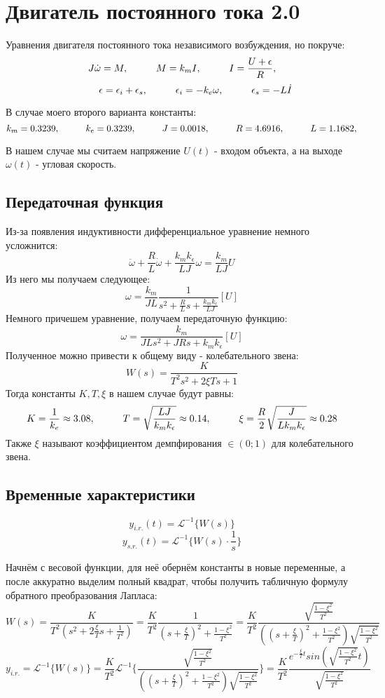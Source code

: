 \chapter{Двигатель постоянного тока 2.0}
\label{ch:chap2}

Уравнения двигателя постоянного тока независимого возбуждения, но покруче:
$$
  J\dot{\omega} = M, \hspace*{1cm} M=k_mI, \hspace*{1cm} I = \frac{U + \epsilon}{R}, 
$$
$$
\hspace*{1cm} \epsilon = \epsilon_i + \epsilon_s, \hspace*{1cm} \epsilon_i = -k_e\omega ,\hspace*{1cm} \epsilon_s = - L\dot{I}
$$

В случае моего второго варианта константы:
$$
  k_m = 0.3239, \hspace*{1cm} k_e = 0.3239, \hspace*{1cm} J =0.0018, \hspace*{1cm} R =4.6916, \hspace*{1cm} L =1.1682, 
$$

В нашем случае мы считаем напряжение $U(t)$ - входом объекта, а на выходе $\omega(t)$ - угловая скорость.

\section{Передаточная функция}
Из-за появления индуктивности дифференциальное уравнение немного усложнится:
$$
\ddot{\omega} + \frac{R}{L}\dot{\omega} + \frac{k_m k_\epsilon}{LJ}\omega = \frac{k_m}{LJ}U
$$
Из него мы получаем следующее:
$$
\omega = \frac{k_m}{JL}\frac{1}{s^2 + \frac{R}{L}s + \frac{k_m k_\epsilon}{LJ}}[U]
$$
Немного причешем уравнение, получаем передаточную функцию:
$$
\omega = \frac{k_m}{JLs^2 + JRs + k_m k_\epsilon}[U]
$$
Полученное можно привести к общему виду - колебательного звена:
$$
W(s) = \frac{K}{T^2 s^2 + 2\xi Ts + 1}
$$
Тогда константы $K, T, \xi$ в нашем случае будут равны:
$$
 K= \frac{1}{k_e} \approx 3.08, \hspace*{1cm} T = \sqrt{\frac{LJ}{k_m k_\epsilon}}\approx 0.14, \hspace*{1cm} \xi = \frac{R}{2}\sqrt{\frac{J}{L k_m k_\epsilon}} \approx 0.28
$$
Также $\xi$ называют коэффициентом демпфирования $\in (0; 1)$ для колебательного звена.

\section{Временные  характеристики}

$$
y_{i.r.}(t) = \mathcal{L}^{-1}\{W(s)\}
$$
$$
y_{s.r.}(t) = \mathcal{L}^{-1}\{W(s)\cdot \frac{1}{s}\}
$$

Начнём с весовой функции, для неё обернём константы в новые переменные, а после аккуратно выделим полный квадрат, чтобы получить табличную формулу обратного преобразования Лапласа:
$$
  W(s) = \frac{K}{T^2(s^2 + 2\frac{\xi}{T}s + \frac{1}{T^2})} = \frac{K}{T^2}\frac{1}{(s + \frac{\xi}{T})^2 + \frac{1-\xi^2}{T^2}} = \frac{K}{T^2}\frac{\sqrt{\frac{1-\xi^2}{T^2}}}{((s + \frac{\xi}{T})^2 + \frac{1-\xi^2}{T^2})\sqrt{\frac{1-\xi^2}{T^2}}}
$$
$$
  y_{i.r.} = \mathcal{L}^{-1}\{W(s)\} = \frac{K}{T^2} \mathcal{L}^{-1}\bigg\{\frac{\sqrt{\frac{1-\xi^2}{T^2}}}{((s + \frac{\xi}{T})^2 + \frac{1-\xi^2}{T^2})\sqrt{\frac{1-\xi^2}{T^2}}}\bigg\} = \frac{K}{T^2} \frac{e^{-\frac{\xi}{T}t}sin(\sqrt{\frac{1-\xi^2}{T^2}}t)}{\sqrt{\frac{1-\xi^2}{T^2}}}
$$

